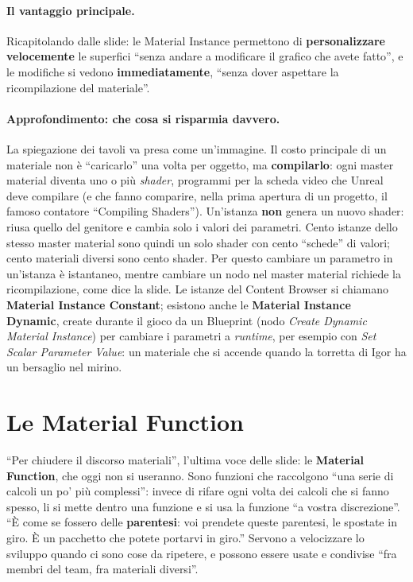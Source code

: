 \paragraph{Il vantaggio principale.} Ricapitolando dalle slide: le Material Instance
permettono di \textbf{personalizzare velocemente} le superfici ``senza andare a
modificare il grafico che avete fatto'', e le modifiche si vedono
\textbf{immediatamente}, ``senza dover aspettare la ricompilazione del materiale''.

\paragraph{Approfondimento: che cosa si risparmia davvero.} La spiegazione dei tavoli
va presa come un'immagine. Il costo principale di un materiale non è ``caricarlo'' una
volta per oggetto, ma \textbf{compilarlo}: ogni master material diventa uno o più
\emph{shader}, programmi per la scheda video che Unreal deve compilare (e che fanno
comparire, nella prima apertura di un progetto, il famoso contatore ``Compiling
Shaders''). Un'istanza \textbf{non} genera un nuovo shader: riusa quello del genitore e
cambia solo i valori dei parametri. Cento istanze dello stesso master material sono
quindi un solo shader con cento ``schede'' di valori; cento materiali diversi sono cento
shader. Per questo cambiare un parametro in un'istanza è istantaneo, mentre cambiare un
nodo nel master material richiede la ricompilazione, come dice la slide. Le istanze del
Content Browser si chiamano \textbf{Material Instance Constant}; esistono anche le
\textbf{Material Instance Dynamic}, create durante il gioco da un Blueprint (nodo
\emph{Create Dynamic Material Instance}) per cambiare i parametri a \emph{runtime}, per
esempio con \emph{Set Scalar Parameter Value}: un materiale che si accende quando la
torretta di Igor ha un bersaglio nel mirino.

\section{Le Material Function}
\label{ue3:sec:function}

``Per chiudere il discorso materiali'', l'ultima voce delle slide: le \textbf{Material
Function}, che oggi non si useranno. Sono funzioni che raccolgono ``una serie di calcoli
un po' più complessi'': invece di rifare ogni volta dei calcoli che si fanno spesso, li
si mette dentro una funzione e si usa la funzione ``a vostra discrezione''. ``È come se
fossero delle \textbf{parentesi}: voi prendete queste parentesi, le spostate in giro. È
un pacchetto che potete portarvi in giro.'' Servono a velocizzare lo sviluppo quando ci
sono cose da ripetere, e possono essere usate e condivise ``fra membri del team, fra
materiali diversi''.

